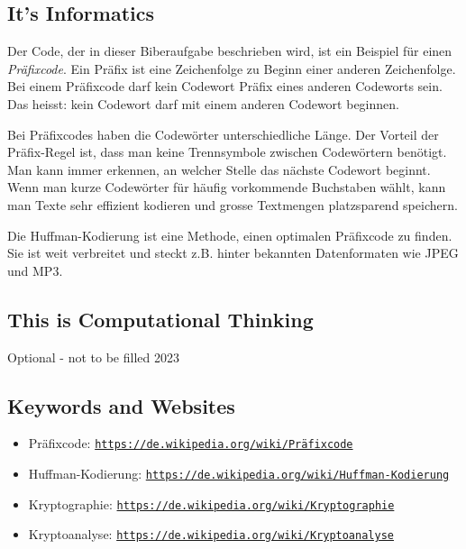 \documentclass[a4paper,11pt]{report}
\newcommand{\BrochureUrlText}[1]{\texttt{#1}}
\begin{document}
\subsection*{It’s Informatics}

Der Code, der in dieser Biberaufgabe beschrieben wird, ist ein Beispiel für einen \emph{Präfixcode}. Ein Präfix ist eine Zeichenfolge zu Beginn einer anderen Zeichenfolge. Bei einem Präfixcode darf kein Codewort Präfix eines anderen Codeworts sein. Das heisst: kein Codewort darf mit einem anderen Codewort beginnen.

Bei Präfixcodes haben die Codewörter unterschiedliche Länge. Der Vorteil der Präfix-Regel ist, dass man keine Trennsymbole zwischen Codewörtern benötigt. Man kann immer erkennen, an welcher Stelle das nächste Codewort beginnt. Wenn man kurze Codewörter für häufig vorkommende Buchstaben wählt, kann man Texte sehr effizient kodieren und grosse Textmengen platzsparend speichern.

Die Huffman-Kodierung ist eine Methode, einen optimalen Präfixcode zu finden. Sie ist weit verbreitet und steckt z.B. hinter bekannten Datenformaten wie JPEG und MP3.


\subsection*{This is Computational Thinking}

Optional - not to be filled 2023

{\raggedright

\subsection*{Keywords and Websites}

\begin{itemize}
  \item Präfixcode: \href{https://de.wikipedia.org/wiki/Pr\%C3\%A4fixcode}{\BrochureUrlText{https://de.wikipedia.org/wiki/Präfixcode}}
  \item Huffman-Kodierung: \href{https://de.wikipedia.org/wiki/Huffman-Kodierung}{\BrochureUrlText{https://de.wikipedia.org/wiki/Huffman-Kodierung}}
  \item Kryptographie: \href{https://de.wikipedia.org/wiki/Kryptographie}{\BrochureUrlText{https://de.wikipedia.org/wiki/Kryptographie}}
  \item Kryptoanalyse: \href{https://de.wikipedia.org/wiki/Kryptoanalyse}{\BrochureUrlText{https://de.wikipedia.org/wiki/Kryptoanalyse}}
\end{itemize}


}
\end{document}
